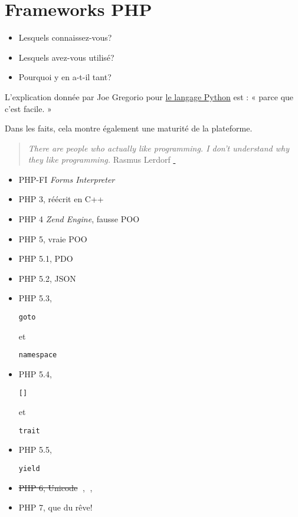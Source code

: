 \hypertarget{frameworks-php}{%
\section{Frameworks PHP}\label{frameworks-php}}

\begin{itemize}
\tightlist
\item
  Lesquels connaissez-vous?
\item
  Lesquels avez-vous utilisé?
\item
  Pourquoi y en a-t-il tant?
\end{itemize}

L'explication donnée par Joe Gregorio pour
\href{http://bitworking.org/news/Why_so_many_Python_web_frameworks}{le
langage Python} est : « parce que c'est facile. »

Dans les faits, cela montre également une maturité de la plateforme.

\begin{quote}
\emph{There are people who actually like programming. I don't understand
why they like programming.} Rasmus Lerdorf
\href{https://en.wikiquote.org/wiki/Rasmus_Lerdorf}{💬}
\end{quote}

\begin{itemize}
\tightlist
\item
  PHP-FI \emph{Forms Interpreter}
\item
  PHP 3, réécrit en C++
\item
  PHP 4 \emph{Zend Engine}, fausse POO
\item
  PHP 5, vraie POO
\item
  PHP 5.1, PDO
\item
  PHP 5.2, JSON
\item
  PHP 5.3,
  \begin{otherlanguage}{english}\texttt{goto}\end{otherlanguage} et
  \begin{otherlanguage}{english}\texttt{namespace}\end{otherlanguage}
\item
  PHP 5.4,
  \begin{otherlanguage}{english}\texttt{{[}{]}}\end{otherlanguage} et
  \begin{otherlanguage}{english}\texttt{trait}\end{otherlanguage}
\item
  PHP 5.5,
  \begin{otherlanguage}{english}\texttt{yield}\end{otherlanguage}
\item
  \sout{PHP 6, Unicode} 💩, 🎃, 🐧
\item
  PHP 7, que du rêve!
\end{itemize}

